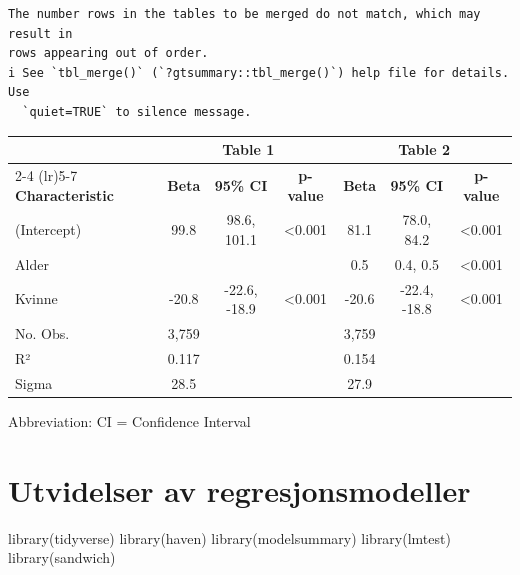 \documentclass[
  norsk,
  letterpaper,
  DIV=11,
  numbers=noendperiod]{scrreprt}
\newenvironment{Shaded}{\begin{snugshade}}{\end{snugshade}}
\newcommand{\FunctionTok}[1]{\textcolor[rgb]{0.28,0.35,0.67}{#1}}
\newcommand{\NormalTok}[1]{\textcolor[rgb]{0.00,0.23,0.31}{#1}}
\theoremstyle{definition}
\theoremstyle{remark}
\begin{document}
\begin{verbatim}
The number rows in the tables to be merged do not match, which may result in
rows appearing out of order.
i See `tbl_merge()` (`?gtsummary::tbl_merge()`) help file for details. Use
  `quiet=TRUE` to silence message.
\end{verbatim}

\begin{table}
\fontsize{12.0pt}{14.0pt}\selectfont
\begin{tabular*}{\linewidth}{@{\extracolsep{\fill}}lcccccc}
\toprule
 & \multicolumn{3}{c}{\textbf{Table 1}} & \multicolumn{3}{c}{\textbf{Table 2}} \\ 
\cmidrule(lr){2-4} \cmidrule(lr){5-7}
\textbf{Characteristic} & \textbf{Beta} & \textbf{95\% CI} & \textbf{p-value} & \textbf{Beta} & \textbf{95\% CI} & \textbf{p-value} \\ 
\midrule\addlinespace[2.5pt]
(Intercept) & 99.8 & 98.6, 101.1 & <0.001 & 81.1 & 78.0, 84.2 & <0.001 \\ 
Alder &  &  &  & 0.5 & 0.4, 0.5 & <0.001 \\ 
Kvinne & -20.8 & -22.6, -18.9 & <0.001 & -20.6 & -22.4, -18.8 & <0.001 \\ 
{No. Obs.} & {3,759} & {} & {} & {3,759} & {} & {} \\ 
R² & 0.117 &  &  & 0.154 &  &  \\ 
Sigma & 28.5 &  &  & 27.9 &  &  \\ 
\bottomrule
\end{tabular*}
\begin{minipage}{\linewidth}
\vspace{.05em}
Abbreviation: CI = Confidence Interval\\
\end{minipage}
\end{table}

\chapter{Utvidelser av
regresjonsmodeller}\label{utvidelser-av-regresjonsmodeller}

\begin{Shaded}
\begin{Highlighting}[]
\FunctionTok{library}\NormalTok{(tidyverse)}
\FunctionTok{library}\NormalTok{(haven)}
\FunctionTok{library}\NormalTok{(modelsummary)}
\FunctionTok{library}\NormalTok{(lmtest)}
\FunctionTok{library}\NormalTok{(sandwich)}
\end{Highlighting}
\end{Shaded}
\end{document}
